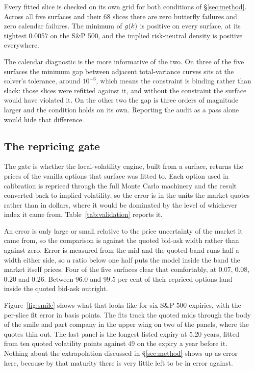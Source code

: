Every fitted slice is checked on its own grid for both conditions of
\S\ref{sec:method}. Across all five surfaces and their 68 slices there are zero
butterfly failures and zero calendar failures. The minimum of $g(k)$ is
positive on every surface, at its tightest 0.0057 on the S\&P 500, and the
implied risk-neutral density is positive everywhere.

The calendar diagnostic is the more informative of the two. On three of the
five surfaces the minimum gap between adjacent total-variance curves sits at
the solver's tolerance, around $10^{-6}$, which means the constraint is binding
rather than slack: those slices were refitted against it, and without the
constraint the surface would have violated it. On the other two the gap is
three orders of magnitude larger and the condition holds on its own. Reporting
the audit as a pass alone would hide that difference.

\subsection{The repricing gate}



The gate is whether the local-volatility engine, built from a surface, returns
the prices of the vanilla options that surface was fitted to. Each option used
in calibration is repriced through the full Monte Carlo machinery and the
result converted back to implied volatility, so the error is in the units the
market quotes rather than in dollars, where it would be dominated by the level
of whichever index it came from. Table~\ref{tab:validation} reports it.

An error is only large or small relative to the price uncertainty of the market
it came from, so the comparison is against the quoted bid-ask width rather than
against zero. Error is measured from the mid and the quoted band runs half a
width either side, so a ratio below one half puts the model inside the band the
market itself prices. Four of the five surfaces clear that comfortably, at
0.07, 0.08, 0.20 and 0.26. Between 96.0 and 99.5 per cent of their repriced
options land inside the quoted bid-ask outright.

Figure~\ref{fig:smile} shows what that looks like for six S\&P 500 expiries,
with the per-slice fit error in basis points. The fits track the quoted mids
through the body of the smile and part company in the upper wing on two of the
panels, where the quotes thin out. The last panel is the longest listed
expiry at 5.20 years, fitted from ten quoted volatility points against 49 on
the expiry a year before it. Nothing about the extrapolation discussed in
\S\ref{sec:method} shows up as error here, because by that maturity there is
very little left to be in error against.

